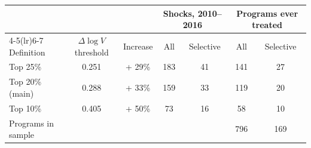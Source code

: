 \begin{tabular}{lcccccc}
\toprule
 & & & \multicolumn{2}{c}{Shocks, 2010--2016} & \multicolumn{2}{c}{Programs ever treated} \\
\cmidrule(lr){4-5}\cmidrule(lr){6-7}
Definition & \(\Delta\log V\) threshold & Increase & All & Selective & All & Selective \\
\midrule
Top 25\% & 0.251 & + 29\% &  183 &   41 &  141 &   27 \\
Top 20\% (main) & 0.288 & + 33\% &  159 &   33 &  119 &   20 \\
Top 10\% & 0.405 & + 50\% &   73 &   16 &   58 &   10 \\
\midrule
Programs in sample & & & & &  796 &  169 \\
\bottomrule
\end{tabular}
